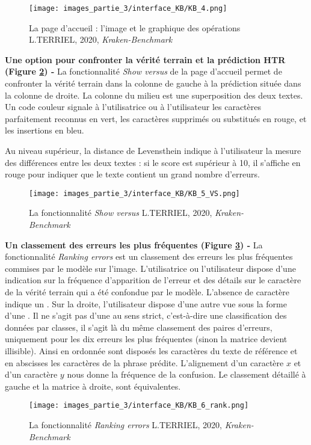 \begin{figure}[H]
    \centering
    \texttt{[image: images\_partie\_3/interface\_KB/KB\_4.png]}
        \caption{La page d'accueil : l'image et le graphique des opérations \textcopyright L.TERRIEL, 2020, \textit{Kraken-Benchmark}}
        \label{fig:accueil_KB_2}
\end{figure}
\newpage
\textbf{Une option pour confronter la vérité terrain et la prédiction HTR (Figure \ref{fig:accueil_KB_3}) - } La fonctionnalité \textit{Show versus} de la page d'accueil permet de confronter la vérité terrain dans la colonne de gauche à la prédiction située dans la colonne de droite. La colonne du milieu est une superposition des deux textes. Un code couleur signale à l'utilisatrice ou à l'utilisateur les caractères parfaitement reconnus en vert, les caractères supprimés ou substitués en rouge, et les insertions en bleu. 

Au niveau supérieur, la distance de Levensthein indique à l'utilisateur la mesure des différences entre les deux textes : si le score est supérieur à 10, il s'affiche en rouge pour indiquer que le texte contient un grand nombre d'erreurs.
\begin{figure}[H]
    \centering
    \texttt{[image: images\_partie\_3/interface\_KB/KB\_5\_VS.png]}
        \caption{La fonctionnalité \textit{Show versus} \textcopyright L.TERRIEL, 2020, \textit{Kraken-Benchmark}}
        \label{fig:accueil_KB_3}
\end{figure}
\bigskip

\textbf{Un classement des erreurs les plus fréquentes (Figure \ref{fig:accueil_KB_4}) - }  La fonctionnalité \textit{Ranking errors} est un classement des erreurs les plus fréquentes commises par le modèle sur l'image. L'utilisatrice ou l'utilisateur dispose d'une indication sur la fréquence d'apparition de l'erreur et des détails sur le caractère de la vérité terrain qui a été confondue par le modèle. L'absence de caractère indique un . Sur la droite, l'utilisateur dispose d'une autre vue sous la forme d'une . Il ne s'agit pas d'une  au sens strict, c'est-à-dire une classification des données par classes, il s'agit là du même classement des paires d'erreurs, uniquement pour les dix erreurs les plus fréquentes (sinon la matrice devient illisible). \newpage Ainsi en ordonnée sont disposés les caractères du texte de référence et en abscisses les caractères de la phrase prédite. L'alignement d'un caractère $x$ et d'un caractère $y$ nous donne la fréquence de la confusion. Le classement détaillé à gauche et la matrice à droite, sont équivalentes. 
\begin{figure}[H]
    \centering
    \texttt{[image: images\_partie\_3/interface\_KB/KB\_6\_rank.png]}
        \caption{La fonctionnalité \textit{Ranking errors} \textcopyright L.TERRIEL, 2020, \textit{Kraken-Benchmark}}
        \label{fig:accueil_KB_4}
\end{figure}
\bigskip

